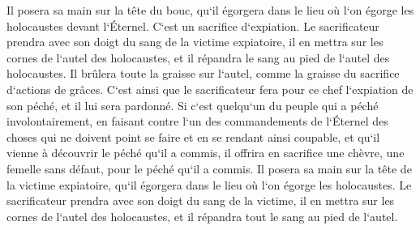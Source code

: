 \verse Il posera sa main sur la tête du bouc, qu`il égorgera dans le lieu où l`on égorge les holocaustes devant l`Éternel. C`est un sacrifice d`expiation. 
\verse Le sacrificateur prendra avec son doigt du sang de la victime expiatoire, il en mettra sur les cornes de l`autel des holocaustes, et il répandra le sang au pied de l`autel des holocaustes. 
\verse Il brûlera toute la graisse sur l`autel, comme la graisse du sacrifice d`actions de grâces. C`est ainsi que le sacrificateur fera pour ce chef l`expiation de son péché, et il lui sera pardonné. 
\verse Si c`est quelqu`un du peuple qui a péché involontairement, en faisant contre l`un des commandements de l`Éternel des choses qui ne doivent point se faire et en se rendant ainsi coupable, 
\verse et qu`il vienne à découvrir le péché qu`il a commis, il offrira en sacrifice une chèvre, une femelle sans défaut, pour le péché qu`il a commis. 
\verse Il posera sa main sur la tête de la victime expiatoire, qu`il égorgera dans le lieu où l`on égorge les holocaustes. 
\verse Le sacrificateur prendra avec son doigt du sang de la victime, il en mettra sur les cornes de l`autel des holocaustes, et il répandra tout le sang au pied de l`autel. 
